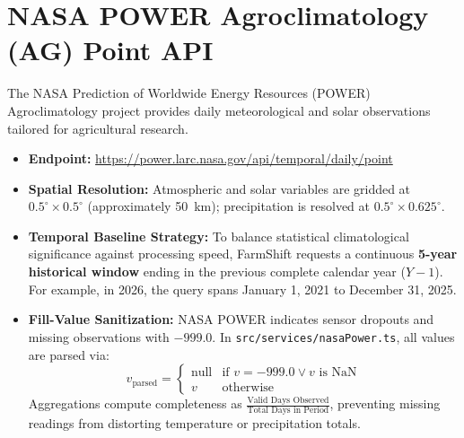 \documentclass[11pt,a4paper]{report}
\begin{document}
\section{NASA POWER Agroclimatology (AG) Point API}
The NASA Prediction of Worldwide Energy Resources (POWER) Agroclimatology project provides daily meteorological and solar observations tailored for agricultural research.
\begin{itemize}
  \item \textbf{Endpoint:} \url{https://power.larc.nasa.gov/api/temporal/daily/point}
  \item \textbf{Spatial Resolution:} Atmospheric and solar variables are gridded at $0.5^\circ \times 0.5^\circ$ (approximately 50~km); precipitation is resolved at $0.5^\circ \times 0.625^\circ$.
  \item \textbf{Temporal Baseline Strategy:} To balance statistical climatological significance against processing speed, FarmShift requests a continuous \textbf{5-year historical window} ending in the previous complete calendar year ($Y-1$). For example, in 2026, the query spans January 1, 2021 to December 31, 2025.
  \item \textbf{Fill-Value Sanitization:} NASA POWER indicates sensor dropouts and missing observations with $-999.0$. In \texttt{src/services/nasaPower.ts}, all values are parsed via:
  \begin{equation}
    v_{\text{parsed}} = \begin{cases} \text{null} & \text{if } v = -999.0 \lor v \text{ is NaN} \\ v & \text{otherwise} \end{cases}
  \end{equation}
  Aggregations compute completeness as $\frac{\text{Valid Days Observed}}{\text{Total Days in Period}}$, preventing missing readings from distorting temperature or precipitation totals.
\end{itemize}
\end{document}
